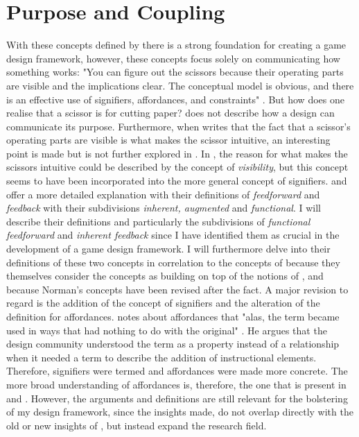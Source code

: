 \section{Purpose and Coupling}
With these concepts defined by  there is a strong foundation for creating a game design framework, however, these concepts focus solely on communicating how something works: "You can figure out the scissors because their operating parts are visible and the implications clear. The conceptual model is obvious, and there is an effective use of signifiers, affordances, and constraints" \cite[p. 27]{norman}. But how does one realise that a scissor is for cutting paper?  does not describe how a design can communicate its purpose. Furthermore, when  writes that the fact that a scissor's operating parts are visible is what makes the scissor intuitive, an interesting point is made but is not further explored in . In , the reason for what makes the scissors intuitive could be described by the concept of \textit{visibility}, but this concept seems to have been incorporated into the more general concept of signifiers.  and  offer a more detailed explanation with their definitions of \textit{feedforward} and \textit{feedback} with their subdivisions \textit{inherent, augmented} and \textit{functional}. I will describe their definitions and particularly the subdivisions of \textit{functional feedforward} and \textit{inherent feedback} since I have identified them as crucial in the development of a game design framework. I will furthermore delve into their definitions of these two concepts in correlation to the concepts of  because they themselves consider the concepts as building on top of the notions of , and because Norman's concepts have been revised \cite{norman} after the fact. A major revision to regard is the addition of the concept of signifiers and the alteration of the definition for affordances.  notes about affordances that "alas, the term became used in ways that had nothing to do with the original" \cite[p. 13]{norman}. He argues that the design community understood the term as a property instead of a relationship when it needed a term to describe the addition of instructional elements. Therefore, signifiers were termed and affordances were made more concrete. The more broad understanding of affordances is, therefore, the one that is present in  and . However, the arguments and definitions are still relevant for the bolstering of my design framework, since the insights made, do not overlap directly with the old or new insights of , but instead expand the research field.

